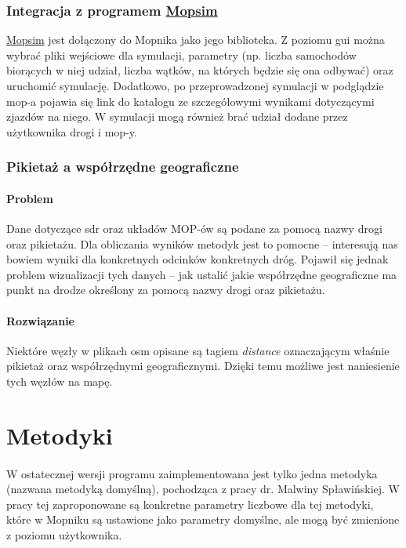 \subsubsection{Integracja z programem \hyperref[r:mopsim]{Mopsim}}
\hyperref[r:mopsim]{Mopsim} jest dołączony do Mopnika jako jego biblioteka. Z
poziomu \acrshort{gui} można wybrać pliki wejściowe dla symulacji,
parametry (np. liczba samochodów biorących w niej udział, liczba wątków,
na których będzie się ona odbywać) oraz uruchomić symulację. Dodatkowo,
po przeprowadzonej symulacji w podglądzie \acrshort{mop}-a pojawia się link do
katalogu ze szczegółowymi wynikami dotyczącymi zjazdów na niego. W symulacji
mogą również brać udział dodane przez użytkownika drogi i \acrshort{mop}-y.
\subsubsection{Pikietaż a współrzędne geograficzne}
\paragraph{Problem} Dane dotyczące \acrshort{sdr} oraz układów MOP-ów są podane
za pomocą nazwy drogi oraz pikietażu. Dla obliczania wyników metodyk jest to
pomocne -- interesują nas bowiem wyniki dla konkretnych odcinków konkretnych
dróg. Pojawił się jednak problem wizualizacji tych danych -- jak ustalić jakie
współrzędne geograficzne ma punkt na drodze określony za pomocą nazwy drogi
oraz pikietażu.
\paragraph{Rozwiązanie} Niektóre węzły w plikach \acrshort{osm} opisane są tagiem
\textit{distance} oznaczającym
właśnie pikietaż oraz współrzędnymi geograficznymi. Dzięki temu możliwe jest
naniesienie tych węzłów na mapę. 

\section{Metodyki}
\paragraph{}
W ostatecznej wersji programu zaimplementowana jest tylko jedna metodyka
(nazwana metodyką domyślną),
pochodząca z pracy dr. Malwiny Spławińskiej\cite{metodyki}.
W pracy tej zaproponowane są konkretne parametry liczbowe dla tej metodyki,
które w Mopniku są ustawione jako parametry domyślne, ale mogą być zmienione
z poziomu użytkownika.
